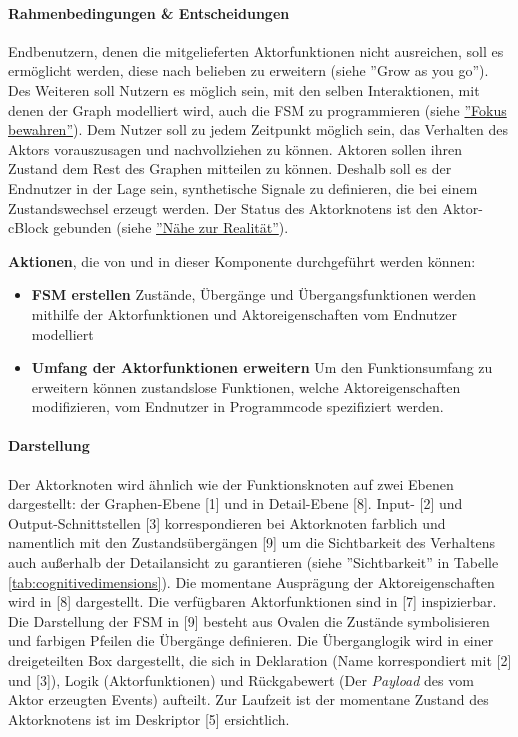 \paragraph{Rahmenbedingungen \& Entscheidungen} Endbenutzern, denen die mitgelieferten Aktorfunktionen nicht ausreichen, soll es ermöglicht werden, diese nach belieben zu erweitern (siehe ''Grow as you go''). Des Weiteren soll Nutzern es möglich sein, mit den selben Interaktionen, mit denen der Graph modelliert wird, auch die \ac{FSM} zu programmieren (siehe \hyperref[par:fokusbewahren]{''Fokus bewahren''}). Dem Nutzer soll zu jedem Zeitpunkt möglich sein, das Verhalten des Aktors vorauszusagen und nachvollziehen zu können. Aktoren sollen ihren Zustand dem Rest des Graphen mitteilen zu können. Deshalb soll es der Endnutzer in der Lage sein, synthetische Signale zu definieren, die bei einem Zustandswechsel erzeugt werden. Der Status des Aktorknotens ist den Aktor-cBlock gebunden (siehe \hyperref[par:naehezurrealitaet]{''Nähe zur Realität''}). 

\textbf{Aktionen}, die von und in dieser Komponente durchgeführt werden können: 
\begin{itemize}
    \item \textbf{\ac{FSM} erstellen} Zustände, Übergänge und Übergangsfunktionen werden mithilfe der Aktorfunktionen und Aktoreigenschaften vom Endnutzer modelliert
    \item \textbf{Umfang der Aktorfunktionen erweitern} Um den Funktionsumfang zu erweitern können zustandslose Funktionen, welche Aktoreigenschaften modifizieren, vom Endnutzer in Programmcode spezifiziert werden.
\end{itemize}

\paragraph{Darstellung} Der Aktorknoten wird ähnlich wie der Funktionsknoten auf zwei Ebenen dargestellt: der Graphen-Ebene [1] und in Detail-Ebene [8]. Input- [2] und Output-Schnittstellen [3] korrespondieren bei Aktorknoten farblich und namentlich mit den Zustandsübergängen [9] um die Sichtbarkeit des Verhaltens auch außerhalb der Detailansicht zu garantieren (siehe ''Sichtbarkeit'' in Tabelle \ref{tab:cognitivedimensions}). Die momentane Ausprägung der Aktoreigenschaften wird in [8] dargestellt. Die verfügbaren Aktorfunktionen sind in [7] inspizierbar. Die Darstellung der \ac{FSM} in [9] besteht aus Ovalen die Zustände symbolisieren und farbigen Pfeilen die Übergänge definieren. Die Überganglogik wird in einer dreigeteilten Box dargestellt, die sich in Deklaration (Name korrespondiert mit [2] und [3]), Logik (Aktorfunktionen) und Rückgabewert (Der \textit{Payload} des vom Aktor erzeugten Events) aufteilt. Zur Laufzeit ist der momentane Zustand des Aktorknotens ist im Deskriptor [5] ersichtlich.

